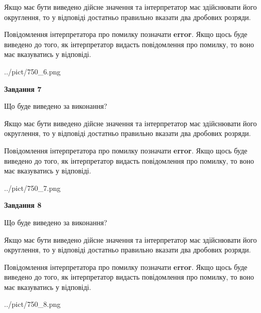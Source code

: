 \documentclass[12pt, ukrainian]{article}
\begin{document}
{\begin {Large}
Якщо має бути виведено дійсне значення та інтерпретатор має здійснювати його округлення, 
то у відповіді достатньо правильно вказати два дробових розряди.

Повідомлення інтерпретатора про помилку позначати \textbf{error}.
Якщо щось буде виведено до того, як інтерпретатор видасть повідомлення про помилку, 
то воно має вказуватись у відповіді. \par

\begin{center}
	{../pict/750_6.png}
\end{center}
\newpage

{\begin {center}\textbf{Завдання 7}\end {center}}\par
Що буде виведено за виконання? \par

Якщо має бути виведено дійсне значення та інтерпретатор має здійснювати його округлення, 
то у відповіді достатньо правильно вказати два дробових розряди.

Повідомлення інтерпретатора про помилку позначати \textbf{error}.
Якщо щось буде виведено до того, як інтерпретатор видасть повідомлення про помилку, 
то воно має вказуватись у відповіді. \par

\begin{center}
	{../pict/750_7.png}
\end{center}
\newpage

{\begin {center}\textbf{Завдання 8}\end {center}}\par
Що буде виведено за виконання? \par

Якщо має бути виведено дійсне значення та інтерпретатор має здійснювати його округлення, 
то у відповіді достатньо правильно вказати два дробових розряди.

Повідомлення інтерпретатора про помилку позначати \textbf{error}.
Якщо щось буде виведено до того, як інтерпретатор видасть повідомлення про помилку, 
то воно має вказуватись у відповіді. \par

\begin{center}
	{../pict/750_8.png}
\end{center}
\newpage


\end{Large}}
\end{document}
